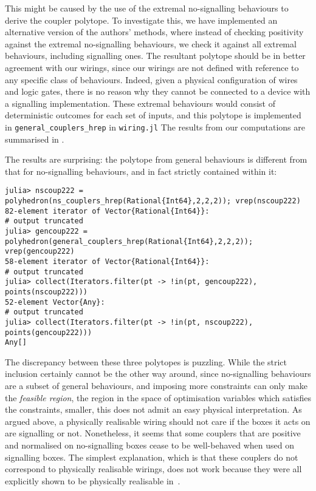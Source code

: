\documentclass[10pt, a4paper]{article}
\numberwithin{equation}{section} %
\theoremstyle{definition}
\theoremstyle{plain}
\newcommand{\?}{\mathrel{?}} %
\begin{document}
                  This might be caused by the use of the extremal no-signalling behaviours to derive the coupler polytope. To investigate this, we have implemented an alternative version of the authors' methods, where instead of checking positivity against the extremal no-signalling behaviours, we check it against all extremal behaviours, including signalling ones. The resultant polytope should be in better agreement with our wirings, since our wirings are not defined with reference to any specific class of behaviours. Indeed, given a physical configuration of wires and logic gates, there is no reason why they cannot be connected to a device with a signalling implementation. These extremal behaviours would consist of deterministic outcomes for each set of inputs, and this polytope is implemented in \verb`general_couplers_hrep` in \verb`wiring.jl` The results from our computations are summarised in .

                  The results are surprising: the polytope from general behaviours is different from that for no-signalling behaviours, and in fact strictly contained within it:
                  \begin{lstlisting}
julia> nscoup222 = polyhedron(ns_couplers_hrep(Rational{Int64},2,2,2)); vrep(nscoup222)
82-element iterator of Vector{Rational{Int64}}:
# output truncated
julia> gencoup222 = polyhedron(general_couplers_hrep(Rational{Int64},2,2,2)); vrep(gencoup222)
58-element iterator of Vector{Rational{Int64}}:
# output truncated
julia> collect(Iterators.filter(pt -> !in(pt, gencoup222), points(nscoup222)))
52-element Vector{Any}:
# output truncated
julia> collect(Iterators.filter(pt -> !in(pt, nscoup222), points(gencoup222)))
Any[]
                  \end{lstlisting}
                  The discrepancy between these three polytopes is puzzling. While the strict inclusion certainly cannot be the other way around, since no-signalling behaviours are a subset of general behaviours, and imposing more constraints can only make the \emph{feasible region}, the region in the space of optimisation variables which satisfies the constraints, smaller, this does not admit an easy physical interpretation. As argued above, a physically realisable wiring should not care if the boxes it acts on are signalling or not. Nonetheless, it seems that some couplers that are positive and normalised on no-signalling boxes cease to be well-behaved when used on signalling boxes. The simplest explanation, which is that these couplers do not correspond to physically realisable wirings, does not work because they were all explicitly shown to be physically realisable in~\cite{ShortEntangleSwap}.
\end{document}
